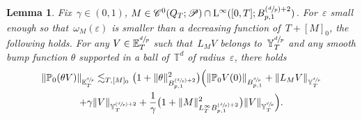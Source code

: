 \documentclass[JEP,XML,SOM,Unicode,published]{cedram}
\newcommand{\Psfrac}[2]{(\sfrac{#1}{#2})}
\newtheorem{lem}[prop]{Lemma}
\theoremstyle{definition}
\newcommand\T{\mathbb{T}}
\renewcommand\L{\mathrm{L}}
\let\ep\varepsilon
\begin{document}
\begin{lem}\label{lem:locbesov}
Fix~$\gamma \in (0,1)$, $M\in\mathscr{C}^{0}(Q_T;\mathscr{P})\cap \L^\infty ([0,T];B^{\Psfrac dp+2}_{p,1}) $.
For~$\ep$ small enough so that~$\omega_M(\ep)$ is smaller than a decreasing function of~$T+[M]_0 $, the following holds. For any $V\in {\mathbb E}^{\sfrac dp}_T$ such that~$L_{M }V $ belongs to~$ {\mathbb Y}^{\sfrac dp}_T$ and any smooth bump function $\theta$ supported in a ball of~$\T^d$ of radius~$\ep$, there holds\vspace*{-3pt}
\begin{multline*}
\|\mathbb{P}_0(\theta V)\|_{{\mathbb E}^{\sfrac dp}_T} \lesssim_{T,[M]_0} \bigl(1+ \|\theta\|^2_{B^{\Psfrac dp+2}_{p,1}} \bigr)\Bigl(\|\mathbb{P}_0 V (0)\|_{B^{\sfrac dp}_{p,1}} + \| L_{M }V\|_{{\mathbb Y}^{\sfrac dp}_T} \\+ \gamma \|V\|_{{{\mathbb Y}^{\Psfrac dp +2}_T }} +\frac 1 \gamma\bigl(1+ \|M\|^2_{{L^\infty_T B^{\Psfrac dp+2}_{p,1} }} \bigr) \|V\|_{{{\mathbb Y}^{\sfrac dp}_T }} \Bigr).
\end{multline*}
\end{lem}
\end{document}
